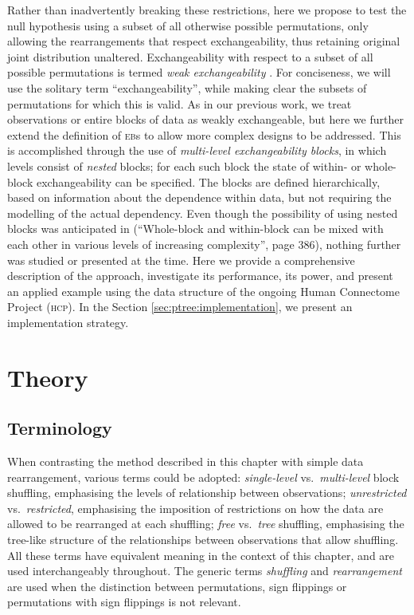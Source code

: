 Rather than inadvertently breaking these restrictions, here we propose to test the null hypothesis using a subset of all otherwise possible permutations, only allowing the rearrangements that respect exchangeability, thus retaining original joint distribution unaltered. Exchangeability with respect to a subset of all possible permutations is termed \emph{weak exchangeability} \citep{Good2005}. For conciseness, we will use the solitary term ``exchangeability'', while making clear the subsets of permutations for which this is valid. As in our previous work, we treat observations or entire blocks of data as weakly exchangeable, but here we further extend the definition of \textsc{eb}s to allow more complex designs to be addressed. This is accomplished through the use of \emph{multi-level exchangeability blocks}, in which levels consist of \emph{nested} blocks; for each such block the state of within- or whole-block exchangeability can be specified. The blocks are defined hierarchically, based on information about the dependence within data, but not requiring the modelling of the actual dependency. Even though the possibility of using nested blocks was anticipated in \citet{Winkler2014} (``Whole-block and within-block can be mixed with each other in various levels of increasing complexity'', page 386), nothing further was studied or presented at the time. Here we provide a comprehensive description of the approach, investigate its performance, its power, and present an applied example using the data structure of the ongoing Human Connectome Project (\textsc{hcp}). In the Section \ref{sec:ptree:implementation}, we present an implementation strategy.

\section{Theory}

\subsection{Terminology}

When contrasting the method described in this chapter with simple data rearrangement, various terms could be adopted: \emph{single-level} vs.\ \emph{multi-level} block shuffling, emphasising the levels of relationship between observations; \emph{unrestricted} vs.\ \emph{restricted}, emphasising the imposition of restrictions on how the data are allowed to be rearranged at each shuffling; \emph{free} vs.\ \emph{tree} shuffling, emphasising the tree-like structure of the relationships between observations that allow shuffling. All these terms have equivalent meaning in the context of this chapter, and are used interchangeably throughout. The generic terms \emph{shuffling} and \emph{rearrangement} are used when the distinction between permutations, sign flippings or permutations with sign flippings is not relevant.

